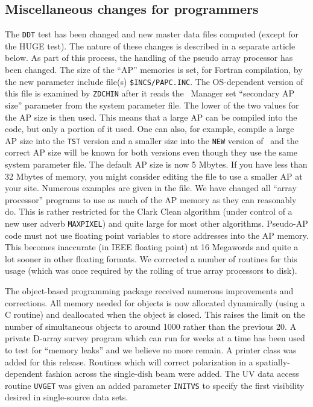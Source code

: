 \subsection{Miscellaneous changes for programmers}

The {\tt DDT} test has been changed and new master data files computed
(except for the HUGE test).  The nature of these changes is described
in a separate article below.  As part of this process, the handling of
the pseudo array processor has been changed.  The size of the ``AP''
memories is set, for Fortran compilation, by the new parameter include
file(s) \hbox{{\tt \$INCS/PAPC.INC}}.  The OS-dependent version of
this file is examined by {\tt ZDCHIN} after it reads the \AIPS\
Manager set ``secondary AP size'' parameter from the system parameter
file.  The lower of the two values for the AP size is then used.  This
means that a large AP can be compiled into the code, but only a
portion of it used.  One can also, for example, compile a large AP
size into the {\tt TST} version and a smaller size into the {\tt NEW}
version of \AIPS\ and the correct AP size will be known for both
versions even though they use the same system parameter file.  The
default AP size is now 5 Mbytes.  If you have less than 32 Mbytes of
memory, you might consider editing the file to use a smaller AP at
your site.  Numerous examples are given in the file.  We have changed
all ``array processor'' programs to use as much of the AP memory as
they can reasonably do.  This is rather restricted for the Clark Clean
algorithm (under control of a new user adverb {\tt MAXPIXEL}) and
quite large for most other algorithms.  Pseudo-AP code must not use
floating point variables to store addresses into the AP memory.  This
becomes inaccurate (in IEEE floating point) at 16 Megawords and quite
a lot sooner in other floating formats.  We corrected a number of
routines for this usage (which was once required by the rolling of
true array processors to disk).

The object-based programming package received numerous improvements
and corrections.  All memory needed for objects is now allocated
dynamically (using a C routine) and deallocated when the object is
closed.  This raises the limit on the number of simultaneous objects
to around 1000 rather than the previous 20.  A private D-array survey
program which can run for weeks at a time has been used to test for
``memory leaks'' and we believe no more remain.  A printer class was
added for this release.  Routines which will correct polarization
in a spatially-dependent fashion across the single-dish beam were
added.  The UV data access routine {\tt UVGET} was given an added
parameter {\tt INITVS} to specify the first visibility desired in
single-source data sets.

